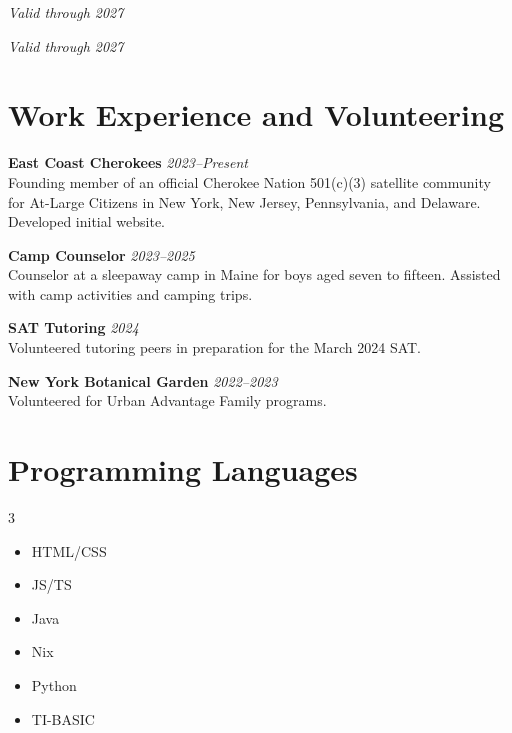 \documentclass[11pt]{article}
\begin{document}
 \hfill \textit{Valid through 2027}

\vspace{1.5ex}

 \hfill \textit{Valid through 2027}

\section*{Work Experience and Volunteering}

\textbf{East Coast Cherokees} \hfill \textit{2023--Present} \\
Founding member of an official Cherokee Nation 501(c)(3) satellite community for At-Large Citizens in New York, New Jersey, Pennsylvania, and Delaware. Developed initial website. 

\vspace{1.5ex}

\textbf{Camp Counselor} \hfill \textit{2023--2025} \\
Counselor at a sleepaway camp in Maine for boys aged seven to fifteen. Assisted with camp activities and camping trips. 

\vspace{1.5ex}

\textbf{SAT Tutoring} \hfill \textit{2024} \\
Volunteered tutoring peers in preparation for the March 2024 SAT.

\vspace{1.5ex}

\textbf{New York Botanical Garden} \hfill \textit{2022--2023} \\
Volunteered for Urban Advantage Family programs.

\section*{Programming Languages}
\setlength{\multicolsep}{0.5ex}
\begin{multicols}{3}
\begin{itemize}[leftmargin=*, nosep]
  \item HTML/CSS
  \item JS/TS
  \item Java
  \item Nix
  \item Python
  \item TI-BASIC
\end{itemize}
\end{multicols}
\end{document}
